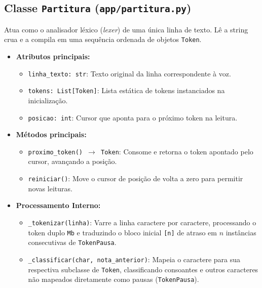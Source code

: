 \documentclass[12pt, a4paper]{article}
\begin{document}
\subsection{Classe \texttt{Partitura} (\texttt{app/partitura.py})}
Atua como o analisador léxico (\textit{lexer}) de uma única linha de texto. Lê a string crua e a compila em uma sequência ordenada de objetos \texttt{Token}.
\begin{itemize}
  \item \textbf{Atributos principais:}
    \begin{itemize}
      \item \texttt{linha\_texto: str}: Texto original da linha correspondente à voz.
      \item \texttt{tokens: List[Token]}: Lista estática de tokens instanciados na inicialização.
      \item \texttt{posicao: int}: Cursor que aponta para o próximo token na leitura.
    \end{itemize}
  \item \textbf{Métodos principais:}
    \begin{itemize}
      \item \texttt{proximo\_token() $\rightarrow$ Token}: Consome e retorna o token apontado pelo cursor, avançando a posição.
      \item \texttt{reiniciar()}: Move o cursor de posição de volta a zero para permitir novas leituras.
    \end{itemize}
  \item \textbf{Processamento Interno:}
    \begin{itemize}
      \item \texttt{\_tokenizar(linha)}: Varre a linha caractere por caractere, processando o token duplo \texttt{Mb} e traduzindo o bloco inicial \texttt{[n]} de atraso em $n$ instâncias consecutivas de \texttt{TokenPausa}.
      \item \texttt{\_classificar(char, nota\_anterior)}: Mapeia o caractere para sua respectiva subclasse de \texttt{Token}, classificando consoantes e outros caracteres não mapeados diretamente como pausas (\texttt{TokenPausa}).
    \end{itemize}
\end{itemize}
\end{document}
